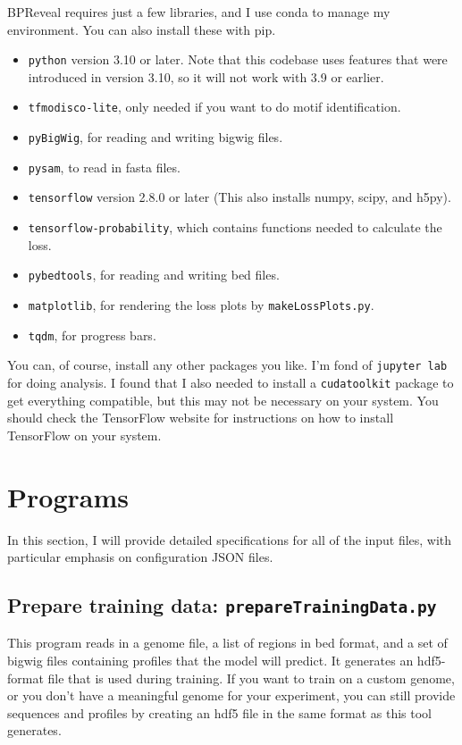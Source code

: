 \documentclass{article}
\begin{document}
BPReveal requires just a few libraries, and I use conda to manage my environment.
You can also install these with pip.

\begin{itemize}
    \item \texttt{python} version 3.10 or later. Note that this codebase uses features that were
        introduced in version 3.10, so it will not work with 3.9 or earlier.
    \item \texttt{tfmodisco-lite}, only needed if you want to do motif identification.
    \item \texttt{pyBigWig}, for reading and writing bigwig files.
    \item \texttt{pysam}, to read in fasta files.
    \item \texttt{tensorflow} version 2.8.0 or later (This also installs numpy, scipy, and h5py).
    \item \texttt{tensorflow-probability}, which contains functions needed to calculate the loss.
    \item \texttt{pybedtools}, for reading and writing bed files.
    \item \texttt{matplotlib}, for rendering the loss plots by \texttt{makeLossPlots.py}.
    \item \texttt{tqdm}, for progress bars.
\end{itemize}

You can, of course, install any other packages you like.
I'm fond of \texttt{jupyter lab} for doing analysis.
I found that I also needed to install a \texttt{cudatoolkit} package to get everything compatible,
but this may not be necessary on your system.
You should check the TensorFlow website for instructions on how to install TensorFlow on your
system.


\newpage

\section{Programs}

In this section, I will provide detailed specifications for all of the input files, with
particular emphasis on configuration JSON files.

\newpage
\subsection{Prepare training data: \texttt{prepareTrainingData.py}}

This program reads in a genome file, a list of regions in bed format, and a set of bigwig
files containing profiles that the model will predict.
It generates an hdf5-format file that is used during training.
If you want to train on a custom genome, or you don't have a meaningful genome for your
experiment, you can still provide sequences and profiles by creating an hdf5 file
in the same format as this tool generates.
\end{document}
